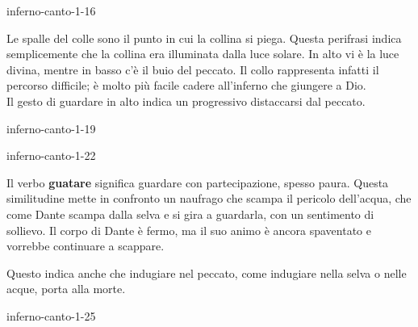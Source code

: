 \documentclass[preview]{standalone}
\begin{document}
\begin{snippet}{inferno-canto-1-16}

    Le spalle del colle sono il punto in cui la collina si piega.
    Questa perifrasi indica semplicemente che la collina era illuminata dalla luce solare.
    In alto vi è la luce divina, mentre in basso c'è il buio del peccato.
    Il collo rappresenta infatti il percorso difficile; è molto più facile
    cadere all'inferno che giungere a Dio. \\
    Il gesto di guardare in alto indica un progressivo distaccarsi dal peccato.
\end{snippet}

\begin{snippet}{inferno-canto-1-19}

\end{snippet}

\begin{snippet}{inferno-canto-1-22}

    Il verbo \textbf{guatare} significa guardare con partecipazione, spesso paura.
    Questa similitudine mette in confronto un naufrago che scampa il pericolo dell'acqua,
    che come Dante scampa dalla selva e si gira a guardarla, con un sentimento di sollievo.
    Il corpo di Dante è fermo, ma il suo animo è ancora spaventato e vorrebbe continuare a scappare.
    
    Questo indica anche che indugiare nel peccato, come indugiare nella selva o nelle acque, porta alla morte.
\end{snippet}

\begin{snippet}{inferno-canto-1-25}

\end{snippet}
\end{document}
